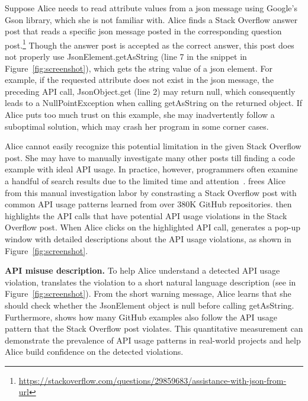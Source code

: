 
Suppose Alice needs to read attribute values from a json message using Google's Gson library, which she is not familiar with. Alice finds a Stack Overflow answer post that reads a specific json message posted in the corresponding question post.\footnote{\url{https://stackoverflow.com/questions/29859683/assistance-with-json-from-url}} Though the answer post is accepted as the correct answer, this post does not properly use {\ttt JsonElement.getAsString} (line 7 in the snippet in Figure~\ref{fig:screenshot}), which gets the string value of a json element. For example, if the requested attribute does not exist in the json message, the preceding API call, {\ttt JsonObject.get} (line 2) may return {\ttt null}, which consequently leads to a {\ttt NullPointException} when calling {\ttt getAsString} on the returned object. If Alice puts too much trust on this example, she may inadvertently follow a suboptimal solution, which may crash her program in some corner cases. 

Alice cannot easily recognize this potential limitation in the given Stack Overflow post. She may have to manually investigate many other posts till finding a code example with ideal API usage. In practice, however, programmers often examine a handful of search results due to the limited time and attention~\cite{brandt2009two, starke2009working, duala2012asking}. {\tool} frees Alice from this manual investigation labor by constrasting a Stack Overflow post with common API usage patterns learned from over 380K GitHub repositories. {\tool} then highlights the API calls that have potential API usage violations in the Stack Overflow post. When Alice clicks on the highlighted API call, {\tool} generates a pop-up window with detailed descriptions about the API usage violations, as shown in Figure~\ref{fig:screenshot}.

{\bf API misuse description.} To help Alice understand a detected API usage violation, {\tool} translates the violation to a short natural language description (see  in Figure~\ref{fig:screenshot}). From  the short warning message, Alice learns that she should check whether the {\ttt JsonElement} object is null before calling {\ttt getAsString}. Furthermore, {\tool} shows how many GitHub examples also follow the API usage pattern that the Stack Overflow post violates. This quantitative measurement can demonstrate the prevalence of API usage patterns in real-world projects and help Alice build confidence on the detected violations.

